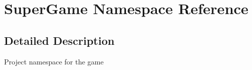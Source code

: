 \hypertarget{namespace_super_game}{\section{Super\-Game Namespace Reference}
\label{namespace_super_game}
}


\subsection{Detailed Description}
Project namespace for the game 